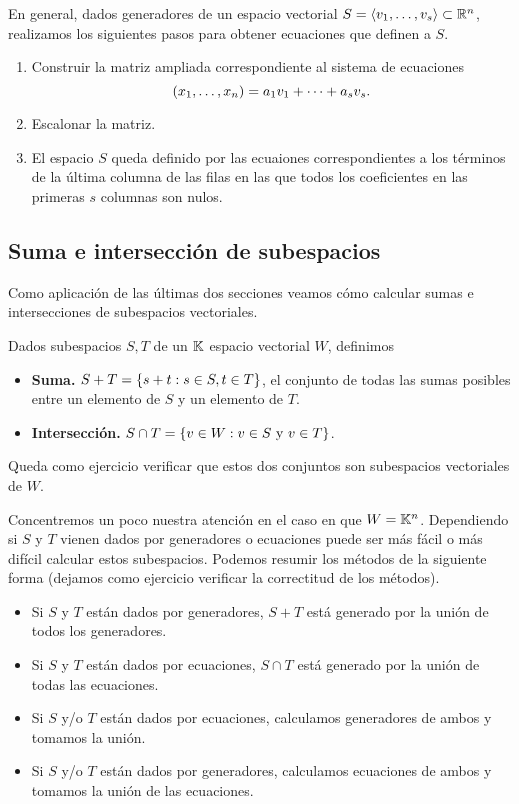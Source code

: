 En general, dados generadores de un espacio vectorial $S = \langle \vb_1, \dots, \vb_s \rangle \subset \R^n$, realizamos los siguientes pasos para obtener ecuaciones que definen a $S$.
\begin{enumerate}
\item Construir la matriz ampliada correspondiente al sistema de ecuaciones
$$
(x_1, \dots, x_n) = a_1 \vb_1 + \dots + a_s \vb_s.
$$
\item Escalonar la matriz.
\item El espacio $S$ queda definido por las ecuaiones correspondientes a los términos de la \'ultima columna de las filas en las que todos los coeficientes en las primeras $s$ columnas son nulos.
\end{enumerate}

\subsection{Suma e intersecci\'on de subespacios}

Como aplicación de las últimas dos secciones veamos cómo calcular sumas e intersecciones de subespacios vectoriales.

\tccdefi
\begin{definicion}
Dados subespacios $S, T$ de un $\mathbb K$ espacio vectorial $W$, definimos
\begin{itemize}
\item \textbf{Suma.} $S + T = \{ \sbb + \tbb : \sbb \in S, \tbb \in T\}$, el conjunto de todas las sumas posibles entre un elemento de $S$ y un elemento de $T$.
\item \textbf{Intersección.} $S \cap T = \{ \vb \in W: \vb \in S \text{ y } \vb \in T\}$.
\end{itemize}
\end{definicion}
\etcc
Queda como ejercicio verificar que estos dos conjuntos son subespacios vectoriales de $W$.

Concentremos un poco nuestra atención en el caso en que $W=\mathbb K^n$. Dependiendo si $S$ y $T$ vienen dados por generadores o ecuaciones puede ser más fácil o más difícil calcular estos subespacios. Podemos resumir los métodos de la siguiente forma (dejamos como ejercicio verificar la correctitud de los métodos).

\begin{itemize}
\item Si $S$ y $T$ est\'an dados por generadores, $S + T$ est\'a generado por la unión de todos los generadores.
\item Si $S$ y $T$ est\'an dados por ecuaciones, $S \cap T$ est\'a generado por la unión de todas las ecuaciones.
\item Si $S$ y/o $T$ est\'an dados por ecuaciones, calculamos generadores de ambos y tomamos la unión.
\item Si $S$ y/o $T$ est\'an dados por generadores, calculamos ecuaciones de ambos y tomamos la unión de las ecuaciones.
\end{itemize}

